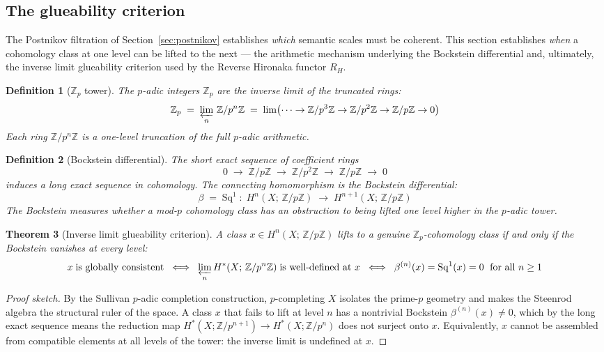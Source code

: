 \documentclass[11pt,a4paper]{article}
\newtheorem{theorem}{Theorem}[section]
\newtheorem{definition}[theorem]{Definition}
\begin{document}
\subsection{The glueability criterion}

The Postnikov filtration of Section~\ref{sec:postnikov} establishes
\emph{which} semantic scales must be coherent.
This section establishes \emph{when} a cohomology class at one level
can be lifted to the next --- the arithmetic mechanism underlying
the Bockstein differential and, ultimately, the
inverse limit glueability criterion used by the Reverse Hironaka
functor $R_H$.

\begin{definition}[$\mathbb{Z}_p$ tower]
The $p$-adic integers $\mathbb{Z}_p$ are the inverse limit of the
truncated rings:
\[
  \mathbb{Z}_p \;=\; \varprojlim_n\, \mathbb{Z}/p^n\mathbb{Z}
  \;=\; \lim\bigl(\cdots \to \mathbb{Z}/p^3\mathbb{Z} \to
                         \mathbb{Z}/p^2\mathbb{Z} \to
                         \mathbb{Z}/p\mathbb{Z} \to 0\bigr)
\]
Each ring $\mathbb{Z}/p^n\mathbb{Z}$ is a one-level truncation
of the full $p$-adic arithmetic.
\end{definition}

\begin{definition}[Bockstein differential]
The short exact sequence of coefficient rings
\[
  0 \;\to\; \mathbb{Z}/p\mathbb{Z}
    \;\to\; \mathbb{Z}/p^2\mathbb{Z}
    \;\to\; \mathbb{Z}/p\mathbb{Z} \;\to\; 0
\]
induces a long exact sequence in cohomology.
The connecting homomorphism is the \emph{Bockstein differential}:
\[
  \beta \;=\; \mathrm{Sq}^1 \;:\;
  H^n(X;\,\mathbb{Z}/p\mathbb{Z})
  \;\longrightarrow\;
  H^{n+1}(X;\,\mathbb{Z}/p\mathbb{Z})
\]
The Bockstein measures whether a mod-$p$ cohomology class has an
obstruction to being lifted one level higher in the $p$-adic tower.
\end{definition}

\begin{theorem}[Inverse limit glueability criterion]
\label{thm:il-glueability}
A class $x \in H^n(X;\,\mathbb{Z}/p\mathbb{Z})$ lifts to a genuine
$\mathbb{Z}_p$-cohomology class if and only if the Bockstein vanishes
at every level:
\[
  x \;\text{is globally consistent}
  \;\iff\;
  \varprojlim_n H^*(X;\,\mathbb{Z}/p^n\mathbb{Z})
  \;\text{is well-defined at } x
  \;\iff\;
  \beta^{(n)}(x) = \mathrm{Sq}^1(x) = 0
  \;\text{ for all } n \geq 1
\]
\end{theorem}

\begin{proof}[Proof sketch]
By the Sullivan $p$-adic completion construction, $p$-completing $X$
isolates the prime-$p$ geometry and makes the Steenrod algebra the
structural ruler of the space.
A class $x$ that fails to lift at level $n$ has a nontrivial
Bockstein $\beta^{(n)}(x) \neq 0$, which by the long exact sequence
means the reduction map $H^*(X;\mathbb{Z}/p^{n+1}) \to H^*(X;\mathbb{Z}/p^n)$
does not surject onto $x$.
Equivalently, $x$ cannot be assembled from compatible elements at
all levels of the tower: the inverse limit is undefined at $x$.
\end{proof}
\end{document}
